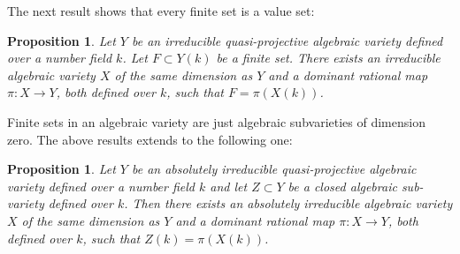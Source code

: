 \documentclass[leqno,12pt]{article} %
\theoremstyle{plain} %
\newtheorem{proposition}[theorem]{\indent\sc Proposition}
\theoremstyle{definition} %
\begin{document}
The next result shows that every finite set is a value set:

 \begin{proposition}\label{P.finite}
 Let $Y$ be an irreducible quasi-projective algebraic variety defined over a number field $k$. Let $F\subset Y(k)$ be a finite set. There exists an irreducible algebraic variety $X$ of the same dimension as $Y$ and a dominant rational map $\pi: X\to Y$, both defined over $k$, such that  $F=\pi(X(k))$.
\end{proposition}  

Finite sets in an algebraic variety are just algebraic subvarieties of dimension zero. The above results extends to the following one:

\begin{proposition}\label{P.finite2}
Let $Y$ be an absolutely irreducible quasi-projective algebraic variety defined over a number field $k$ and let $Z\subset Y$ be a closed algebraic sub-variety defined over $k$. Then there exists an absolutely irreducible algebraic variety $X$ of the same dimension as $Y$ and a dominant rational map $\pi: X\to Y$, both defined over $k$, such that  $Z(k)=\pi(X(k))$.
\end{proposition}
\end{document}
